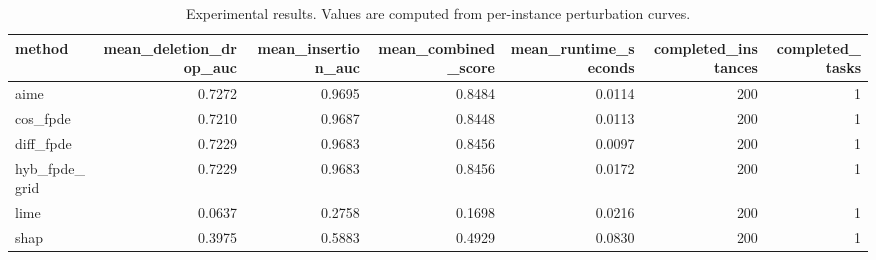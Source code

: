 \begin{table}[t]
\caption{Experimental results. Values are computed from per-instance perturbation curves.}
\label{tab:main_results_computed}
\centering
\begin{tabular}{lrrrrrr}
\toprule
method & mean\_deletion\_drop\_auc & mean\_insertion\_auc & mean\_combined\_score & mean\_runtime\_seconds & completed\_instances & completed\_tasks \\
\midrule
aime & 0.7272 & 0.9695 & 0.8484 & 0.0114 & 200 & 1 \\
cos\_fpde & 0.7210 & 0.9687 & 0.8448 & 0.0113 & 200 & 1 \\
diff\_fpde & 0.7229 & 0.9683 & 0.8456 & 0.0097 & 200 & 1 \\
hyb\_fpde\_grid & 0.7229 & 0.9683 & 0.8456 & 0.0172 & 200 & 1 \\
lime & 0.0637 & 0.2758 & 0.1698 & 0.0216 & 200 & 1 \\
shap & 0.3975 & 0.5883 & 0.4929 & 0.0830 & 200 & 1 \\
\bottomrule
\end{tabular}

\end{table}
